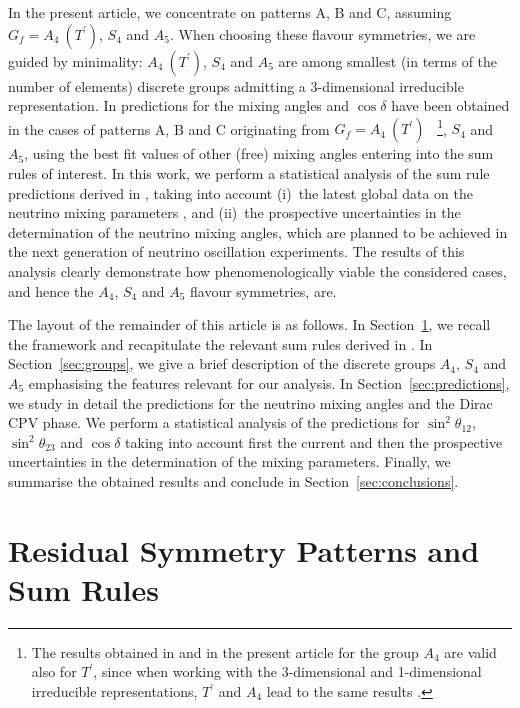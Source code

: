 \documentclass[11pt,a4paper]{article}
\def\th{\theta}
\numberwithin{equation}{section}
\begin{document}
 In the present article, we concentrate on patterns A, B and C, 
 assuming $G_f = A_4~(T^\prime)$, $S_4$ and $A_5$. 
When choosing these flavour symmetries, we are guided by minimality: 
$A_4~(T^\prime)$, $S_4$ and $A_5$ are among smallest
(in terms of the number of elements) 
discrete groups admitting a 3-dimensional irreducible representation.
In \cite{Girardi:2015rwa} predictions for the 
mixing angles and $\cos\delta$ 
have been obtained in the cases of patterns A, B and C
originating from $G_f = A_4~(T^\prime)$~%
\footnote{The results obtained in \cite{Girardi:2015rwa}
and in the present article for the group $A_4$ are valid also
for $T^\prime$, since when working
with the 3-dimensional and 1-dimensional irreducible representations,
$T^\prime$ and  $A_4$ lead to the same results \cite{Feruglio:2007uu}.}, 
$S_4$ and $A_5$, using
the best fit values
of other (free) mixing angles entering into the sum rules of interest. 
In this work, we perform a statistical analysis of the sum rule predictions 
derived in  \cite{Girardi:2015rwa}, 
taking into account 
(i)~the latest global data on the neutrino
mixing parameters \cite{NuFITv32Jan2018}, 
and (ii)~the prospective uncertainties in the determination of
the neutrino mixing angles, which are planned to be achieved in
the next generation of neutrino oscillation experiments.
The results of this analysis clearly demonstrate how phenomenologically viable
the considered cases, and hence the $A_4$, $S_4$ and $A_5$ 
flavour symmetries, are. 

 The layout of the remainder of this article is as follows. 
In Section~\ref{sec:patterns}, we recall the framework and recapitulate  
the relevant sum rules derived in \cite{Girardi:2015rwa}. 
In Section~\ref{sec:groups}, we give a brief description of 
the discrete groups $A_4$, $S_4$ and $A_5$ emphasising 
the features relevant for our analysis. 
In Section~\ref{sec:predictions}, we study in detail the predictions 
for the neutrino mixing angles and the Dirac CPV phase. 
We perform a statistical analysis of the predictions for 
$\sin^2\th_{12}$, $\sin^2\th_{23}$ and $\cos\delta$ 
taking into account first the current and then 
the prospective uncertainties in the determination of the mixing parameters.
Finally, we summarise the obtained results and conclude 
in Section~\ref{sec:conclusions}.


\section{Residual Symmetry Patterns and Sum Rules}
\label{sec:patterns}
\end{document}
